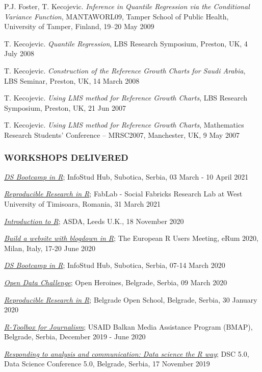 \documentclass[
]{article}
\begin{document}
P.J. Foster, T. Kecojevic. \emph{Inference in Quantile Regression via
the Conditional Variance Function}, MANTAWORL09, Tamper School of Public
Health, University of Tamper, Finland, 19--20 May 2009

T. Kecojevic. \emph{Quantile Regression}, LBS Research Symposium,
Preston, UK, 4 July 2008

T. Kecojevic. \emph{Construction of the Reference Growth Charts for
Saudi Arabia}, LBS Seminar, Preston, UK, 14 March 2008

T. Kecojevic. \emph{Using LMS method for Reference Growth Charts}, LBS
Research Symposium, Preston, UK, 21 Jun 2007

T. Kecojevic. \emph{Using LMS method for Reference Growth Charts},
Mathematics Research Students' Conference -- MRSC2007, Manchester, UK, 9
May 2007

\hypertarget{workshops-delivered}{%
\subsubsection{WORKSHOPS DELIVERED}\label{workshops-delivered}}

\emph{\href{https://dsbootcampinr.netlify.app/module4/}{DS Bootcamp in
R}}; InfoStud Hub, Subotica, Serbia, 03 March - 10 April 2021

\emph{\href{https://reproducibleresearchinr.rbind.io}{Reproducible
Research in R}}; FabLab - Social Fabricks Research Lab at West
University of Timisoara, Romania, 31 March 2021

\emph{\href{https://introtor.netlify.app}{Introduction to R}}; ASDA,
Leeds U.K., 18 November 2020

\emph{\href{https://websiteinr.netlify.app}{Build a website with
blogdown in R}}; The European R Users Meeting, eRum 2020, Milan, Italy,
17-20 June 2020

\emph{\href{http://dsbootcamp.rbind.io}{DS Bootcamp in R}}; InfoStud
Hub, Subotica, Serbia, 07-14 March 2020

\emph{\href{https://ohsa.netlify.app}{Open Data Challenge}}; Open
Heroines, Belgrade, Serbia, 09 March 2020

\emph{\href{https://reproducibleresearchinr.rbind.io}{Reproducible
Research in R}}; Belgrade Open School, Belgrade, Serbia, 30 January 2020

\emph{\href{https://rtoolbox.netlify.com/en/}{R-Toolbox for
Journalism}}; USAID Balkan Media Assistance Program (BMAP), Belgrade,
Serbia, December 2019 - June 2020

\emph{\href{https://github.com/RLadiesBelgrade/DSC5_RWS/blob/master/DSRWay.html}{Responding
to analysis and communication: Data science the R way}}; DSC 5.0, Data
Science Conference 5.0, Belgrade, Serbia, 17 November 2019
\end{document}
